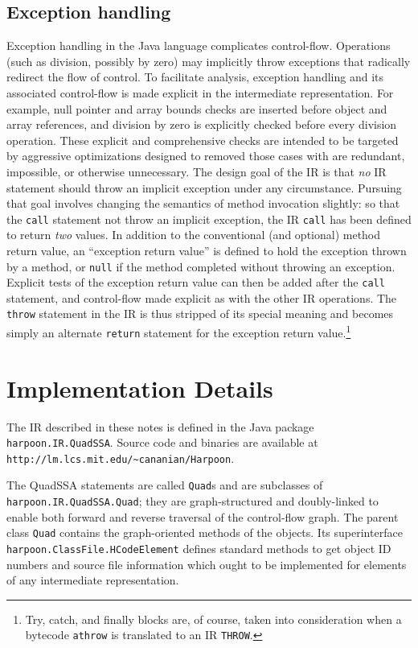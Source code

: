 \documentclass[11pt,notitlepage,twocolumn,twoside]{article}
\newcommand{\bp}{\hspace{0pt}}
\begin{document}
\subsection{Exception handling}
Exception handling in the Java language complicates control-flow.
Operations (such as division, possibly by zero) may implicitly throw
exceptions that radically redirect the flow of control.  To facilitate
analysis, exception handling and its associated control-flow is made
explicit in the intermediate representation.  For example, null
pointer and array bounds checks are inserted before object and array
references, and division by zero is explicitly checked before every
division operation.  These explicit and comprehensive checks are
intended to be targeted by aggressive optimizations designed to
removed those cases with are redundant, impossible, or otherwise
unnecessary.  The design goal of the IR is that \textit{no} IR
statement should throw an implicit exception under any 
circumstance.
Pursuing that goal involves changing the semantics of method
invocation slightly: so that the \texttt{call} statement not throw an
implicit exception, the IR \texttt{call} has been defined to return
\textit{two} values.  In addition to the conventional (and optional)
method return value, an ``exception return value'' is defined to hold
the exception thrown by a method, or \texttt{null} if the method
completed without throwing an exception.  Explicit tests of the
exception return value can then be added after the \texttt{call}
statement, and control-flow made explicit as with the other IR
operations.  The \texttt{throw} statement in the IR is thus stripped
of its special meaning and becomes simply an alternate \texttt{return}
statement for the exception return value.\footnote{Try, catch, and
finally blocks are, of course, taken into consideration when a
bytecode \texttt{athrow} is translated to an IR \texttt{THROW}.}

\section{Implementation Details}

The IR described in these notes is defined in the Java package
\texttt{harpoon.IR.QuadSSA}.  Source code and binaries are available
at {\tt\small http://\bp lm.lcs.mit.edu/\bp \~{}cananian/\bp Harpoon}.

The
QuadSSA statements are called \texttt{Quad}s and are subclasses of
\texttt{harpoon.IR.QuadSSA.Quad}; they are graph-structured and
doubly-linked to enable both forward and reverse traversal of the
control-flow graph.  The parent class \texttt{Quad} contains the
graph-oriented methods of the objects.  Its superinterface
\texttt{harpoon.ClassFile.HCodeElement} defines standard methods to
get object ID numbers and source file information which
ought to be implemented for elements of any intermediate representation.
\end{document}
